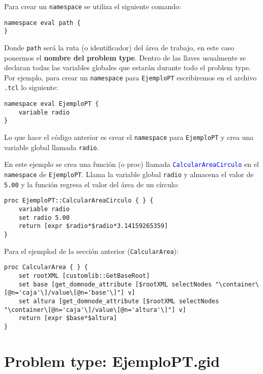 \documentclass[10pt, a4paper, twocolumn]{article} %
\begin{document}
Para crear un \texttt{namespace} se utiliza el siguiente comando:

\lstset{language=tcl} 
\begin{lstlisting}
namespace eval path {
}
\end{lstlisting}

Donde \texttt{path} será la ruta (o identificador) del área de trabajo, en este caso ponermos el \textbf{nombre del problem type}. Dentro de las llaves usualmente se declaran todas las variables globales que estarán durante todo el problem type. Por ejemplo, para crear un \texttt{namespace} para \texttt{EjemploPT} escribiremos en el archivo \texttt{.tcl} lo siguiente:

\lstset{language=tcl} 
\begin{lstlisting}
namespace eval EjemploPT {
	variable radio
}
\end{lstlisting}

Lo que hace el código anterior es crear el \texttt{namespace} para \texttt{EjemploPT} y crea una variable global llamada \texttt{radio}.

En este ejemplo se crea una función (o proc) llamada \textcolor{blue}{\texttt{CalcularAreaCirculo}} en el \texttt{namespace} de \texttt{EjemploPT}. Llama la variable global \texttt{radio} y almacena el valor de \texttt{5.00} y la función regresa el valor del área de un círculo:

\lstset{language=tcl} 
\begin{lstlisting}
proc EjemploPT::CalcularAreaCirculo { } {
	variable radio	
	set radio 5.00
	return [expr $radio*$radio*3.14159265359]
}
\end{lstlisting}

Para el ejemplod de la sección anterior (\texttt{CalcularArea}):

\lstset{language=tcl} 
\begin{lstlisting}[caption={Cálculo del área obteniendo los valores desde el archivo \texttt{.spd} usando las funciones de \texttt{CustomLib}.}]
proc CalcularArea { } {
	set rootXML [customlib::GetBaseRoot]
	set base [get_domnode_attribute [$rootXML selectNodes "\container\[@n='caja'\]/value\[@n='base'\]"] v]
	set altura [get_domnode_attribute [$rootXML selectNodes "\container\[@n='caja'\]/value\[@n='altura'\]"] v]
	return [expr $base*$altura]
}
\end{lstlisting}
 
\section{Problem type: EjemploPT.gid}
\end{document}
